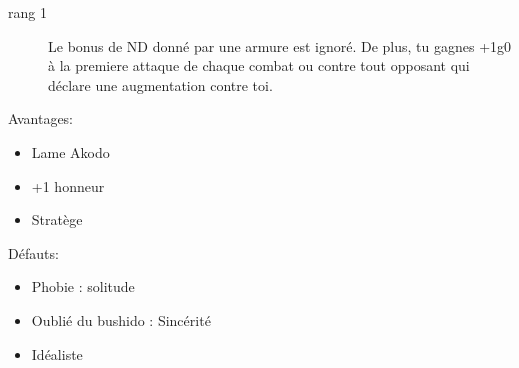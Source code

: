 \documentclass[oneside,12pt]{book}
\begin{document}
\begin{flushleft}
\begin{description}
{}
\item[rang 1]{
Le bonus de ND donné par une armure est ignoré. De plus, tu gagnes +1g0 à la premiere attaque de chaque combat ou contre tout opposant qui déclare une augmentation contre toi. 
}
\end{description}
\vspace{0.2cm}
Avantages:
\begin{itemize}
\item Lame Akodo
\item +1 honneur
\item Stratège
\end{itemize}
Défauts:
\begin{itemize}
\item Phobie : solitude
\item Oublié du bushido : Sincérité
\item Idéaliste
\end{itemize}

\clearpage


\end{flushleft}
\end{document}
